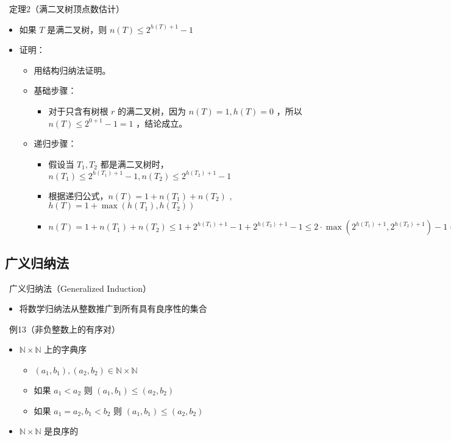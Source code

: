\documentclass[UTF8]{report}
\theoremstyle{MyLineTheoremStyle} %
\theoremstyle{MyBlockTheoremStyle} %
\theoremstyle{MySubsubsectionStyle} %
\begin{document}
\textbullet\ 定理2（满二叉树顶点数估计）
\begin{itemize}
    \item 如果 $T$ 是满二叉树，则 $n(T) \leq 2^{h(T) + 1} - 1$
    \item 证明：
    \begin{itemize}
        \item 用结构归纳法证明。
        \item 基础步骤：
        \begin{itemize}
            \item 对于只含有树根 $r$ 的满二叉树，因为 $n(T) = 1, h(T) = 0$ ，所以 $n(T) \leq 2^{0+1} - 1 = 1$ ，结论成立。
        \end{itemize}
        \item 递归步骤：
        \begin{itemize}
            \item 假设当 $T_1, T_2$ 都是满二叉树时， $n(T_1) \leq 2^{h(T_1) + 1} - 1, n(T_2) \leq 2^{h(T_2) + 1} - 1$
            \item 根据递归公式，$n(T) = 1 + n(T_1) + n(T_2)$ , $h(T) = 1 + \max(h(T_1), h(T_2))$
            \item $n(T) = 1 + n(T_1) + n(T_2) \leq 1 + 2^{h(T_1) + 1} - 1 + 2^{h(T_2) + 1} - 1 \leq 2 \cdot \max(2^{h(T_1) + 1}, 2^{h(T_2) + 1}) - 1 = 2 \cdot 2^{h(T)} - 1 = 2^{h(T) + 1} - 1$
        \end{itemize}
    \end{itemize}
\end{itemize}

\subsection{广义归纳法}

\textbullet\ 广义归纳法（Generalized Induction）
\begin{itemize}
    \item 将数学归纳法从整数推广到所有具有良序性的集合
\end{itemize}

\textbullet\ 例13（非负整数上的有序对）
\begin{itemize}
    \item $\mathbb{N} \times \mathbb{N}$ 上的字典序
    \begin{itemize}
        \item $(a_1, b_1), (a_2, b_2) \in \mathbb{N} \times \mathbb{N}$
        \item 如果 $a_1 < a_2$ 则 $(a_1, b_1) \leq (a_2, b_2)$
        \item 如果 $a_1 = a_2, b_1 < b_2$ 则 $(a_1, b_1) \leq (a_2, b_2)$
    \end{itemize}
    \item $\mathbb{N} \times \mathbb{N}$ 是良序的
\end{itemize}
\end{document}
